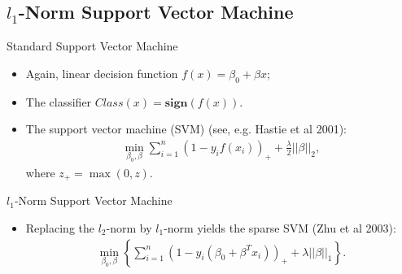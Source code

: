\documentclass[12pt]{beamer}
\newcommand{\1}[1]{{\mathbf 1}\left\{#1\right\}}        %
\begin{document}
\subsection{$l_1$-Norm Support Vector Machine}
\begin{frame}[fragile]{Standard Support Vector Machine}

\begin{itemize}[<+->]
\item Again, linear decision function $f(x) = \beta_0 + \beta x$;
\item The classifier $Class(x) = \textbf{sign} (f(x))$. 
\item  The support vector machine (SVM) (see, e.g. Hastie et al 2001): 
\begin{align*}
\min_{\beta_0,\beta} \sum_{i=1}^n(1-y_if(x_i))_+ + \frac{\lambda}{2} ||\beta||_2,
\end{align*}
where $z_+ = \max(0,z)$. 
\end{itemize}

\end{frame}


\begin{frame}[fragile]{$l_1$-Norm Support Vector Machine}

\begin{itemize}[<+->]  
\item Replacing the $l_2$-norm by $l_1$-norm yields the sparse SVM (Zhu et al 2003):
\begin{align*}
\min_{\beta_0,\beta} \left\{ \sum_{i=1}^n(1-y_i(\beta_0+\beta^Tx_i))_+ + \lambda ||\beta||_1\right\}. 
\end{align*}
\end{itemize}

\end{frame}
\end{document}

